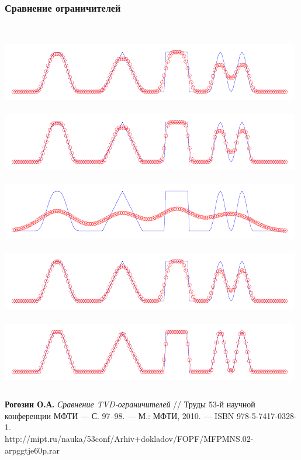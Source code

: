 \documentclass[ucs]{beamer}
\begin{document}
\begin{frame}
	\frametitle{Сравнение ограничителей}
	\begin{columns}
		\\
		\includegraphics[width=\textwidth]{conver/mc}\\
		\\
		\includegraphics[width=\textwidth]{conver/superbee}\\
		\\
		\includegraphics[width=\textwidth]{conver/first}\\
		\\
		\includegraphics[width=\textwidth]{conver/third_g}\\
		\\
		\includegraphics[width=\textwidth]{conver/superbee_g}\\
	\end{columns}
	\begin{block}{}\scriptsize
		\textbf{Рогозин О.А.} \textit{Сравнение TVD-ограничителей}
		// Труды 53-й научной конференции МФТИ — С. 97–98. — 
		М.: МФТИ, 2010. — ISBN 978-5-7417-0328-1. \\ \smallskip\tiny
		http://mipt.ru/nauka/53conf/Arhiv+dokladov/FOPF/MFPMNS.02-arpggtje60p.rar
	\end{block}
\end{frame}
\end{document}
